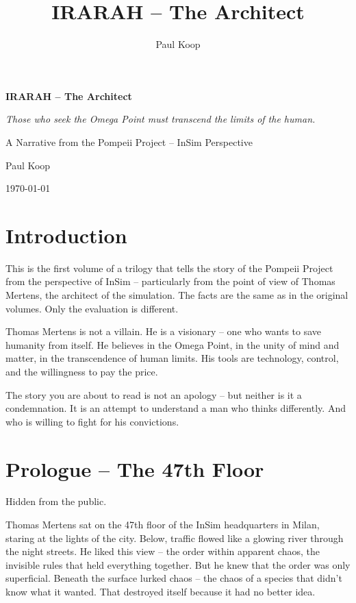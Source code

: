 \documentclass[
]{article}
\title{IRARAH -- The Architect}
\author{Paul Koop}
\date{}
\begin{document}
\begin{titlepage}
  \centering
  \vspace*{2cm}
  {\huge\bfseries IRARAH -- The Architect\par}
  \vspace{1cm}
  {\Large\itshape Those who seek the Omega Point must transcend the limits of the human.\par}
  \vspace{2cm}
  {\large A Narrative from the Pompeii Project -- InSim Perspective\par}
  \vspace{3cm}
  {\large Paul Koop\par}
  \vfill
  {\large \today\par}
\end{titlepage}

\tableofcontents
\newpage

\section*{Introduction}

This is the first volume of a trilogy that tells the story of the Pompeii Project from the perspective of InSim -- particularly from the point of view of Thomas Mertens, the architect of the simulation. The facts are the same as in the original volumes. Only the evaluation is different.

Thomas Mertens is not a villain. He is a visionary -- one who wants to save humanity from itself. He believes in the Omega Point, in the unity of mind and matter, in the transcendence of human limits. His tools are technology, control, and the willingness to pay the price.

The story you are about to read is not an apology -- but neither is it a condemnation. It is an attempt to understand a man who thinks differently. And who is willing to fight for his convictions.

\newpage

\section{Prologue -- The 47th Floor}

Hidden from the public.

Thomas Mertens sat on the 47th floor of the InSim headquarters in Milan, staring at the lights of the city. Below, traffic flowed like a glowing river through the night streets. He liked this view -- the order within apparent chaos, the invisible rules that held everything together. But he knew that the order was only superficial. Beneath the surface lurked chaos -- the chaos of a species that didn't know what it wanted. That destroyed itself because it had no better idea.
\end{document}
